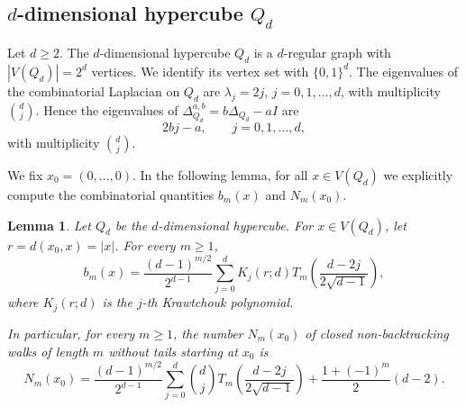 \documentclass[reqno,10pt]{amsart}
\newtheorem{lemma}[theorem]{Lemma}
\theoremstyle{definition}
\numberwithin{equation}{section}
\begin{document}
\subsection{$d$-dimensional hypercube $Q_d$}

Let $d\ge 2$. The $d$-dimensional hypercube $Q_d$ is a $d$-regular graph with $|V(Q_d)|=2^d$ vertices. We identify its vertex set with $\{0,1\}^d$. The eigenvalues of the combinatorial Laplacian on $Q_d$ are $\lambda_j=2j$, $ j=0,1,\ldots,d$, with multiplicity $\binom{d}{j}$. Hence the eigenvalues of $\Delta_{Q_d}^{a,b}=b\Delta_{Q_d}-aI$ are
\[
2bj-a,
\qquad j=0,1,\ldots,d,
\]
with multiplicity $\binom{d}{j}$.

We fix $x_0=(0,\ldots,0)$. In the following lemma, for all $x\in V(Q_d)$ we explicitly compute the combinatorial quantities $b_m(x)$ and $N_m(x_0)$.

\begin{lemma}\label{cor:Qd_bm_Nm}
Let $Q_d$ be the $d$-dimensional hypercube. For $x\in V(Q_d)$, let $r=d(x_0,x)=|x|$.
For every $m\ge1$, 
\begin{equation}\label{bm qd}
b_m(x)
=
\frac{(d-1)^{m/2}}{2^{d-1}}
\sum_{j=0}^{d}
K_j(r;d)
T_m\!\left(
\frac{d-2j}{2\sqrt{d-1}}
\right),
\end{equation}
where $K_j(r;d)$ is the $j$-th Krawtchouk polynomial.

In particular, for every $m\ge 1$, the number $N_m(x_0)$ of closed
non-backtracking walks of length $m$ without tails starting at $x_0$ is
\begin{equation}\label{Q_d_formula}
N_m(x_0) =
\frac{(d-1)^{m/2}}{2^{d-1}}
\sum_{j=0}^{d}
\binom{d}{j}
T_m\!\left(
\frac{d-2j}{2\sqrt{d-1}}
\right) 
+
\frac{1+(-1)^m}{2}(d-2).
\end{equation}
\end{lemma}
\end{document}
